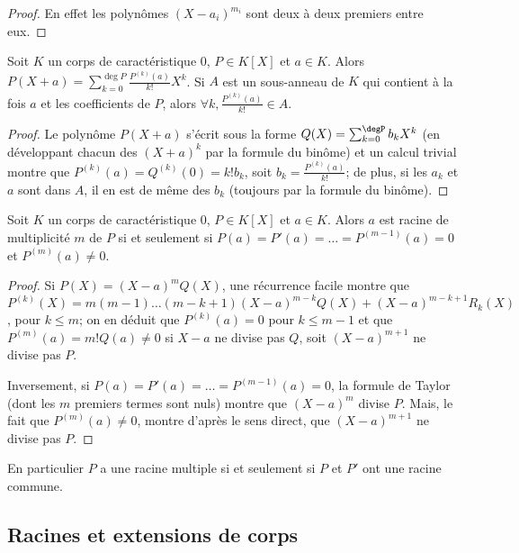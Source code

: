 \begin{proof}
En effet les polynômes $(X - a_i)^{m_i}$ sont deux à deux premiers entre eux.
\end{proof}

\begin{thm}
Soit $K$ un corps de caractéristique 0, $P \in K[X]$ et $a \in K$. Alors $P(X + a) = \sum_{k=0}^{\deg P} \frac{P^{(k)}(a)}{k!} X^k$. Si $A$ est un sous-anneau de $K$ qui contient à la fois $a$ et les coefficients de $P$, alors $\forall k, \frac{P^{(k)}(a)}{k!} \in A$.
\end{thm}

\begin{proof}
Le polynôme $P(X + a)$ s'écrit sous la forme $Q(X) = \sum_{k=0}^{\degP} b_k X^k$ (en développant chacun des $(X + a)^k$ par la formule du binôme) et un calcul trivial montre que $P^{(k)}(a) = Q^{(k)}(0) = k!b_k$, soit $b_k = \frac{P^{(k)}(a)}{k!}$; de plus, si les $a_k$ et $a$ sont dans $A$, il en est de même des $b_k$ (toujours par la formule du binôme).
\end{proof}

\begin{thm}
Soit $K$ un corps de caractéristique 0, $P \in K[X]$ et $a \in K$. Alors $a$ est racine de multiplicité $m$ de $P$ si et seulement si $P(a) = P'(a) = \ldots = P^{(m-1)}(a) = 0$ et $P^{(m)}(a) \neq 0$.
\end{thm}

\begin{proof}
Si $P(X) = (X - a)^m Q(X)$, une récurrence facile montre que $P^{(k)}(X) = m(m - 1)\ldots(m - k + 1)(X - a)^{m-k} Q(X) + (X - a)^{m-k+1} R_k(X)$, pour $k \leq m$; on en déduit que $P^{(k)}(a) = 0$ pour $k \leq m - 1$ et que $P^{(m)}(a) = m!Q(a) \neq 0$ si $X - a$ ne divise pas $Q$, soit $(X - a)^{m+1}$ ne divise pas $P$.

Inversement, si $P(a) = P'(a) = \ldots = P^{(m-1)}(a) = 0$, la formule de Taylor (dont les $m$ premiers termes sont nuls) montre que $(X - a)^m$ divise $P$. Mais, le fait que $P^{(m)}(a) \neq 0$, montre d'après le sens direct, que $(X - a)^{m+1}$ ne divise pas $P$.
\end{proof}

\begin{rem}
En particulier $P$ a une racine multiple si et seulement si $P$ et $P'$ ont une racine commune.
\end{rem}

\subsection{Racines et extensions de corps}

